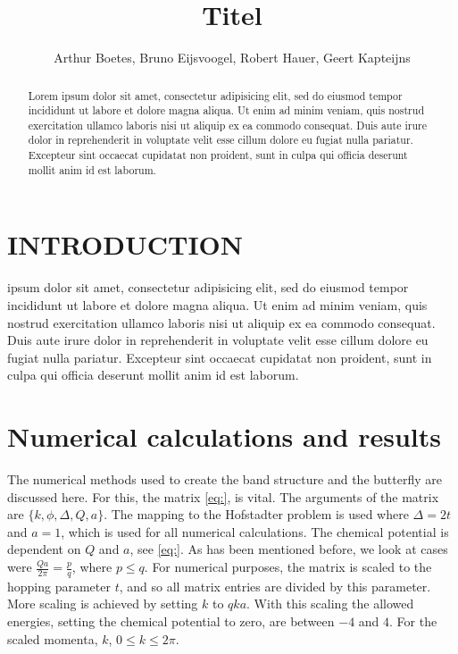 \documentclass[letterpaper, 10 pt, conference]{ieeeconf}  %
\title{\LARGE \bf
  Titel
}
\author{Arthur Boetes, Bruno Eijsvoogel, Robert Hauer, Geert Kapteijns
}
\begin{document}
\maketitle
\thispagestyle{empty}
\pagestyle{empty}


\begin{abstract}

Lorem ipsum dolor sit amet, consectetur adipisicing elit, sed do eiusmod tempor
incididunt ut labore et dolore magna aliqua. Ut enim ad minim veniam, quis
nostrud exercitation ullamco laboris nisi ut aliquip ex ea commodo consequat.
Duis aute irure dolor in reprehenderit in voluptate velit esse cillum dolore eu
fugiat nulla pariatur. Excepteur sint occaecat cupidatat non proident, sunt in
culpa qui officia deserunt mollit anim id est laborum.
\end{abstract}


\section{INTRODUCTION}

ipsum dolor sit amet, consectetur adipisicing elit, sed do eiusmod tempor incididunt ut labore et dolore magna aliqua. Ut enim ad minim veniam, quis nostrud exercitation ullamco laboris nisi ut aliquip ex ea commodo consequat. Duis aute irure dolor in reprehenderit in voluptate velit esse cillum dolore eu fugiat nulla pariatur. Excepteur sint occaecat cupidatat non proident, sunt in culpa qui officia deserunt mollit anim id est laborum.

\section{Numerical calculations and results}
The numerical methods used to create the band structure and the butterfly are discussed here.
For this, the matrix \ref{eq:}, is vital.
The arguments of the matrix are $\{k,\phi,\Delta,Q,a\}$.
The mapping to the Hofstadter problem is used where $\Delta = 2t$ and $a = 1$, which is used for all numerical calculations.
The chemical potential is dependent on $Q$ and $a$, see \ref{eq:}.
As has been mentioned before, we look at cases were 
$\frac{Q a}{2 \pi} = \frac{p}{q}$, where $p \leq q$.
For numerical purposes, the matrix is scaled to the hopping parameter $t$, and so all matrix entries are divided by this parameter.
More scaling is achieved by setting $k$ to $qka$.
With this scaling the allowed energies, setting the chemical potential to zero, are between $-4$ and $4$.
For the scaled momenta, $k$, $0 \leq k \leq 2 \pi$.
\end{document}
